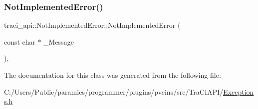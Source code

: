 \subsubsection{\texorpdfstring{Not\+Implemented\+Error()}{NotImplementedError()}\hspace{0.1cm}{\footnotesize\ttfamily [2/2]}}
{\footnotesize\ttfamily traci\+\_\+api\+::\+Not\+Implemented\+Error\+::\+Not\+Implemented\+Error (\begin{DoxyParamCaption}\item[{const char $\ast$}]{\+\_\+\+Message }\end{DoxyParamCaption})\hspace{0.3cm}{\ttfamily [inline]}, {\ttfamily [explicit]}}



The documentation for this class was generated from the following file\+:\begin{DoxyCompactItemize}
\item 
C\+:/\+Users/\+Public/paramics/programmer/plugins/pveins/src/\+Tra\+C\+I\+A\+P\+I/\hyperlink{_exceptions_8h}{Exceptions.\+h}\end{DoxyCompactItemize}
